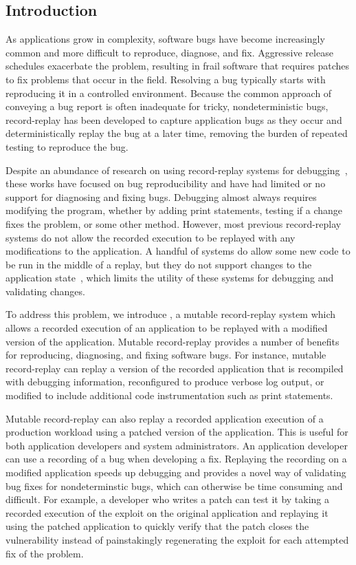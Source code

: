 \subsection{Introduction}

As applications grow in complexity, software bugs have become
increasingly common and more difficult to reproduce, diagnose, and fix.
Aggressive release schedules
exacerbate the problem, resulting in frail software that requires patches to
fix problems that occur in the field. Resolving a bug typically starts with
reproducing it in a controlled environment. Because the common approach of conveying a bug
report is often inadequate for tricky, nondeterministic bugs, record-replay has been developed to
capture application bugs as they occur and
deterministically replay the bug at a later time, removing the burden of
repeated testing to reproduce the bug.

Despite an abundance of research on using record-replay systems for 
debugging~\cite{idna:vee06,instant-replay,r2:osdi,odr:sosp09,pinsel:pldi07,pres:sosp09,jockey,srinivasan:flashback,subhraveti:sigmetrics11}, these works have
focused on bug reproducibility and have had limited or no support for diagnosing
and fixing bugs.
Debugging almost always requires modifying the program, whether by
adding print statements, testing if a change fixes the problem, or
some other method.
However, most previous record-replay systems do not allow the recorded execution
to be replayed with any modifications to the application.
A handful of systems do allow some new code to be run in the middle of a replay,
but they do not support changes to the application
state~\cite{intrusions:sosp05,decouple:usenix08},
which limits the utility of these systems for debugging and validating changes.

To address this problem, we introduce {\dora}, a mutable
record-replay system which allows a recorded execution of an
application to be replayed with a modified version
of the application. Mutable record-replay provides a
number of benefits for reproducing, diagnosing, and fixing software
bugs. For instance, mutable record-replay can replay a version
of the recorded application that is recompiled with debugging information,
reconfigured to produce verbose log output, or modified to include additional
code instrumentation such as print statements.

Mutable record-replay can also replay a recorded
application execution of a production workload using
a patched version of the application. This is
useful for both application developers and system administrators.
An application developer can use a recording of a bug when developing
a fix. Replaying the recording on a modified application speeds up
debugging and provides a novel way of validating
bug fixes for nondeterminstic bugs, which can otherwise be time
consuming and difficult.
For example, a developer who writes a patch
can test it by taking a recorded execution of the exploit on the
original application and replaying it using the patched application to
quickly verify that the patch closes the vulnerability instead of
painstakingly regenerating the exploit for each attempted fix
of the problem.

